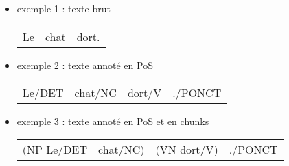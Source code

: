 \documentclass[manual-fr.tex]{subfiles}
\begin{document}
\begin{itemize}
	\item[] exemple 1 : texte brut\\
	\begin{tabular}{ccc}Le & chat & dort.\end{tabular}
	\item[] exemple 2 : texte annoté en PoS\\
	\begin{tabular}{cccc}Le/DET & chat/NC & dort/V & ./PONCT\end{tabular}
	\item[] exemple 3 : texte annoté en PoS et en chunks\\
	\begin{tabular}{cccc}(NP Le/DET & chat/NC) & (VN dort/V) & ./PONCT\end{tabular}
\end{itemize}
\end{document}
